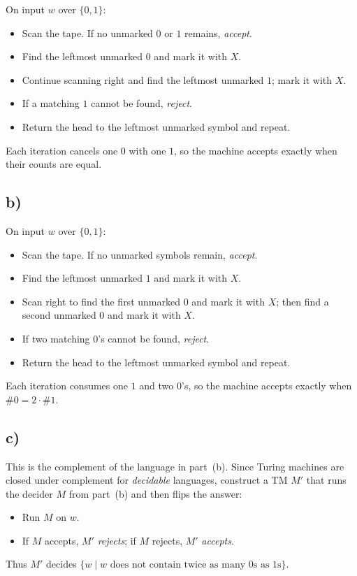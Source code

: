 \documentclass[a4paper, UTF-8]{article}
\theoremstyle{plain}
\begin{document}
On input $w$ over $\{0,1\}$:
\begin{itemize}
    \item Scan the tape. If no unmarked $0$ or $1$ remains, \emph{accept}.
    \item Find the leftmost unmarked $0$ and mark it with $X$.
    \item Continue scanning right and find the leftmost unmarked $1$; mark it with $X$.
    \item If a matching $1$ cannot be found, \emph{reject}.
    \item Return the head to the leftmost unmarked symbol and repeat.
\end{itemize}
Each iteration cancels one $0$ with one $1$, so the machine accepts exactly when their counts are equal.

\subsection{b)}

On input $w$ over $\{0,1\}$:
\begin{itemize}
    \item Scan the tape. If no unmarked symbols remain, \emph{accept}.
    \item Find the leftmost unmarked $1$ and mark it with $X$.
    \item Scan right to find the first unmarked $0$ and mark it with $X$; then find a second unmarked $0$ and mark it with $X$.
    \item If two matching $0$'s cannot be found, \emph{reject}.
    \item Return the head to the leftmost unmarked symbol and repeat.
\end{itemize}
Each iteration consumes one $1$ and two $0$'s, so the machine accepts exactly when $\#0 = 2\cdot\#1$.

\subsection{c)}

This is the complement of the language in part~(b). Since Turing machines are closed under complement for \emph{decidable} languages, construct a TM $M'$ that runs the decider $M$ from part~(b) and then flips the answer:
\begin{itemize}
    \item Run $M$ on $w$.
    \item If $M$ accepts, $M'$ \emph{rejects}; if $M$ rejects, $M'$ \emph{accepts}.
\end{itemize}
Thus $M'$ decides $\{w \mid w \text{ does not contain twice as many 0s as 1s}\}$. 
\end{document}
